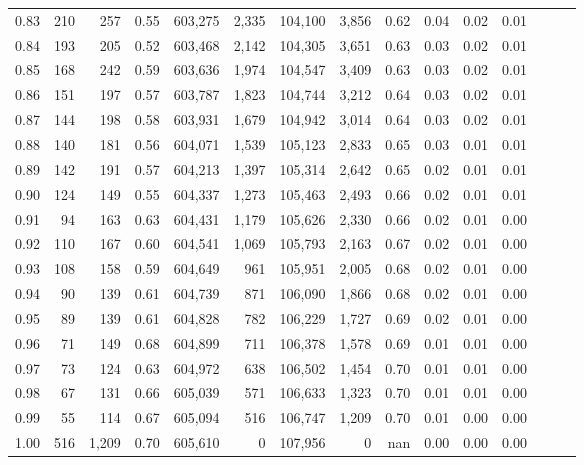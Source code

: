 \begin{tabular}{rrrrrrrrrrrrrrr}
0.83 &     210 &    257 &  0.55 &  603,275 &    2,335 &  104,100 &    3,856 &  0.62 &  0.04 &  0.02 &      0.01 \\
0.84 &     193 &    205 &  0.52 &  603,468 &    2,142 &  104,305 &    3,651 &  0.63 &  0.03 &  0.02 &      0.01 \\
0.85 &     168 &    242 &  0.59 &  603,636 &    1,974 &  104,547 &    3,409 &  0.63 &  0.03 &  0.02 &      0.01 \\
0.86 &     151 &    197 &  0.57 &  603,787 &    1,823 &  104,744 &    3,212 &  0.64 &  0.03 &  0.02 &      0.01 \\
0.87 &     144 &    198 &  0.58 &  603,931 &    1,679 &  104,942 &    3,014 &  0.64 &  0.03 &  0.02 &      0.01 \\
0.88 &     140 &    181 &  0.56 &  604,071 &    1,539 &  105,123 &    2,833 &  0.65 &  0.03 &  0.01 &      0.01 \\
0.89 &     142 &    191 &  0.57 &  604,213 &    1,397 &  105,314 &    2,642 &  0.65 &  0.02 &  0.01 &      0.01 \\
0.90 &     124 &    149 &  0.55 &  604,337 &    1,273 &  105,463 &    2,493 &  0.66 &  0.02 &  0.01 &      0.01 \\
0.91 &      94 &    163 &  0.63 &  604,431 &    1,179 &  105,626 &    2,330 &  0.66 &  0.02 &  0.01 &      0.00 \\
0.92 &     110 &    167 &  0.60 &  604,541 &    1,069 &  105,793 &    2,163 &  0.67 &  0.02 &  0.01 &      0.00 \\
0.93 &     108 &    158 &  0.59 &  604,649 &      961 &  105,951 &    2,005 &  0.68 &  0.02 &  0.01 &      0.00 \\
0.94 &      90 &    139 &  0.61 &  604,739 &      871 &  106,090 &    1,866 &  0.68 &  0.02 &  0.01 &      0.00 \\
0.95 &      89 &    139 &  0.61 &  604,828 &      782 &  106,229 &    1,727 &  0.69 &  0.02 &  0.01 &      0.00 \\
0.96 &      71 &    149 &  0.68 &  604,899 &      711 &  106,378 &    1,578 &  0.69 &  0.01 &  0.01 &      0.00 \\
0.97 &      73 &    124 &  0.63 &  604,972 &      638 &  106,502 &    1,454 &  0.70 &  0.01 &  0.01 &      0.00 \\
0.98 &      67 &    131 &  0.66 &  605,039 &      571 &  106,633 &    1,323 &  0.70 &  0.01 &  0.01 &      0.00 \\
0.99 &      55 &    114 &  0.67 &  605,094 &      516 &  106,747 &    1,209 &  0.70 &  0.01 &  0.00 &      0.00 \\
1.00 &     516 &  1,209 &  0.70 &  605,610 &        0 &  107,956 &        0 &   nan &  0.00 &  0.00 &      0.00 \\
\bottomrule
\end{tabular}
